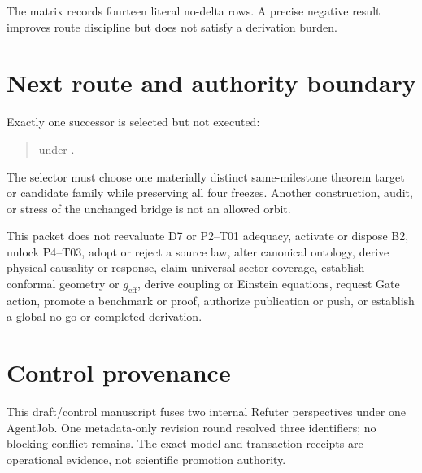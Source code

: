 \documentclass[11pt]{article}
\begin{document}
The matrix records fourteen literal no-delta rows.  A precise negative result
improves route discipline but does not satisfy a derivation burden.

\section{Next route and authority boundary}

Exactly one successor is selected but not executed:
\begin{sloppypar}
\begin{quote}
\small{}

under .
\end{quote}
\end{sloppypar}
The selector must choose one materially distinct same-milestone theorem target
or candidate family while preserving all four freezes.  Another construction,
audit, or stress of the unchanged bridge is not an allowed orbit.

This packet does not reevaluate D7 or P2--T01 adequacy, activate or dispose B2,
unlock P4--T03, adopt or reject a source law, alter canonical ontology, derive
physical causality or response, claim universal sector coverage, establish
conformal geometry or $g_{\mathrm{eff}}$, derive coupling or Einstein
equations, request Gate action, promote a benchmark or proof, authorize
publication or push, or establish a global no-go or completed derivation.

\section*{Control provenance}

This draft/control manuscript fuses two internal Refuter perspectives under
one AgentJob.  One metadata-only revision round resolved three identifiers;
no blocking conflict remains.  The exact model and transaction receipts are
operational evidence, not scientific promotion authority.
\end{document}
